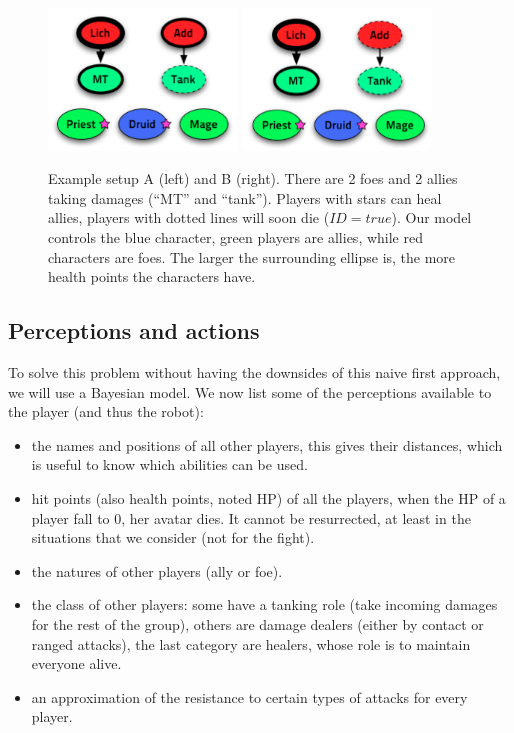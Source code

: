 \begin{figure}[h!]
\begin{center}
\includegraphics[width=5cm]{images/wow_fight1.png} \hspace{1.5cm} \includegraphics[width=5cm]{images/wow_fight2.png}
\caption{Example setup A (left) and B (right). There are 2 foes and 2 allies taking damages (``MT'' and ``tank''). Players with stars can heal allies, players with dotted lines will soon die ($ID=true$). Our model controls the blue character, green players are allies, while red characters are foes. The larger the surrounding ellipse is, the more health points the characters have.}
\label{fig:wow_fight}
\end{center}
\end{figure}

\subsection{Perceptions and actions}
To solve this problem without having the downsides of this naive first approach, we will use a Bayesian model. We now list some of the perceptions available to the player (and thus the robot):
\begin{itemize}
    \item the names and positions of all other players, this gives their distances, which is useful to know which abilities can be used.
    \item hit points (also health points, noted HP) of all the players, when the HP of a player fall to 0, her avatar dies. %
It cannot be resurrected, at least in the situations that we consider (not for the fight).
    \item the natures of other players (ally or foe).
    \item the class of other players: some have a tanking role (take incoming damages for the rest of the group), others are damage dealers (either by contact or ranged attacks), the last category are healers, whose role is to maintain everyone alive.
    \item an approximation of the resistance to certain types of attacks for every player.
\end{itemize}

